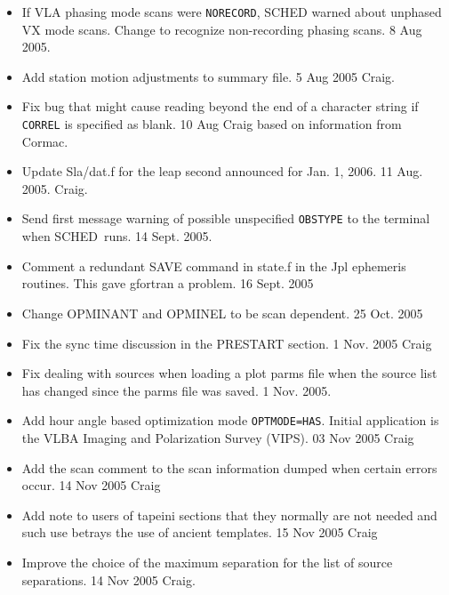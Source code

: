 \documentclass{report}
\newcommand{\schedb}{{\sc SCHED~}}
\begin{document}
\begin{itemize}

\item If VLA phasing mode scans were {\tt NORECORD}, SCHED warned
about unphased VX mode scans.  Change to recognize non-recording
phasing scans.  8 Aug 2005.

\item Add station motion adjustments to summary file.  5 Aug 2005 Craig.

\item Fix bug that might cause reading beyond the end of a character
string if {\tt CORREL} is specified as blank.  10 Aug Craig based on
information from Cormac.

\item Update Sla/dat.f for the leap second announced for Jan. 1, 2006.
11 Aug. 2005.  Craig.

\item Send first message warning of possible unspecified {\tt OBSTYPE}
to the terminal when \schedb runs.  14 Sept. 2005.

\item Comment a redundant SAVE command in state.f in the Jpl ephemeris
routines.  This gave gfortran a problem.  16 Sept. 2005

\item Change OPMINANT and OPMINEL to be scan dependent.  25 Oct. 2005

\item Fix the sync time discussion in the PRESTART section.  1 Nov. 2005 Craig

\item Fix dealing with sources when loading a plot parms file when the
source list has changed since the parms file was saved.  1 Nov. 2005.

\item Add hour angle based optimization mode {\tt OPTMODE=HAS}.
Initial application is the VLBA Imaging and Polarization Survey
(VIPS).  03 Nov 2005 Craig

\item Add the scan comment to the scan information dumped when certain
errors occur.  14 Nov 2005 Craig

\item Add note to users of tapeini sections that they normally are not
needed and such use betrays the use of ancient templates.  15 Nov 2005 Craig

\item Improve the choice of the maximum separation for the list of
source separations.  14 Nov 2005  Craig.


\end{itemize}
\end{document}
